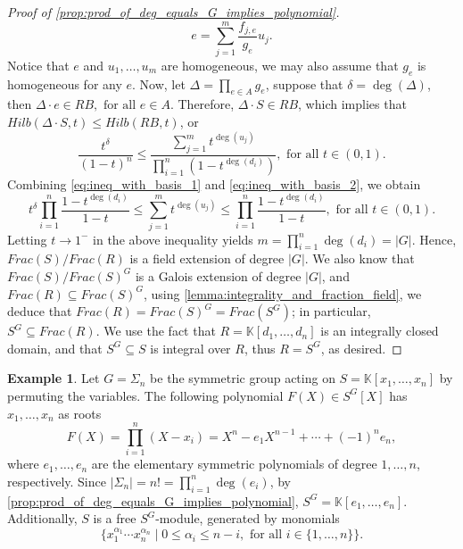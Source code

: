 \documentclass[12pt,a4paper]{report}
\theoremstyle{definition}
\theoremstyle{remark}
\theoremstyle{definition}
\newtheorem{example}[theorem]{Example}
\begin{document}
\begin{proof}[Proof of \cref{prop:prod_of_deg_equals_G_implies_polynomial}]
    \begin{equation*}
        e = \sum\limits_{j=1}^{m}\dfrac{f_{j, e}}{g_{e}}u_j.
    \end{equation*}
    Notice that $e$ and $u_1, \ldots, u_m$ are homogeneous, we may also assume that $g_e$ is homogeneous for any $e$. Now, let $\Delta =\prod\limits_{e\in A}g_e$, suppose that $\delta = \deg(\Delta)$, then $\Delta\cdot e\in RB, \text{ for all } e\in A$. Therefore, $\Delta\cdot S\in RB$, which implies that $Hilb(\Delta\cdot S, t)\leq Hilb(RB, t)$, or
    \begin{equation}\label{eq:ineq_with_basis_2}
        \dfrac{t^{\delta}}{(1-t)^n}\leq \dfrac{\sum\limits_{j=1}^{m}t^{\deg(u_j)}}{\prod\limits_{i=1}^{n}\left(1-t^{\deg(d_i)}\right)}, \text{ for all } t\in (0, 1).
    \end{equation}
    Combining \eqref{eq:ineq_with_basis_1} and \eqref{eq:ineq_with_basis_2}, we obtain
    \begin{equation*}
        t^{\delta}\prod\limits_{i=1}^{n}\dfrac{1-t^{\deg(d_i)}}{1-t}\leq \sum\limits_{j=1}^{m}t^{\deg(u_j)}\leq \prod\limits_{i=1}^{n}\dfrac{1-t^{\deg(d_i)}}{1-t}, \text{ for all } t\in (0, 1).
    \end{equation*}
    Letting $t\to 1^{-}$ in the above inequality yields $m = \prod\limits_{i=1}^{n}\deg(d_i) = |G|$. Hence, $Frac(S)/Frac(R)$ is a field extension of degree $|G|$. We also know that $Frac(S)/Frac(S)^G$ is a Galois extension of degree $|G|$, and $Frac(R) \subseteq Frac(S)^G$, using \cref{lemma:integrality_and_fraction_field}, we deduce that $Frac(R) = Frac(S)^G = Frac(S^G)$; in particular, $S^G\subseteq Frac(R)$. We use the fact that $R = \mathbb{K}[d_1, \ldots, d_n]$ is an integrally closed domain, and that $S^G \subseteq S$ is integral over $R$, thus $R = S^G$, as desired.
\end{proof}
\begin{example}\label{example:symmetric_polynomial}
    Let $G=\Sigma_n$ be the symmetric group acting on $S = \mathbb{K}[x_1, \ldots, x_n]$ by permuting the variables. The following polynomial $F(X)\in S^G[X]$ has $x_1, \ldots, x_n$ as roots
    \begin{equation*}
        F(X) = \prod\limits_{i=1}^{n}(X-x_i) = X^n - e_1 X^{n-1} + \cdots  + (-1)^n e_n,
    \end{equation*}
    where $e_1, \ldots, e_n$ are the elementary symmetric polynomials of degree $1, \ldots, n$, respectively. Since $|\Sigma_n| = n! = \prod\limits_{i=1}^n \deg(e_i)$, by \cref{prop:prod_of_deg_equals_G_implies_polynomial}, $S^G = \mathbb{K}[e_1, \ldots, e_n]$. Additionally, $S$ is a free $S^G$-module, generated by monomials
    \begin{equation*}
        \{x_1^{\alpha_1}\cdots x_n^{\alpha_n}\mid 0\leq\alpha_i \leq n-i, \text{ for all } i\in \{1, \ldots, n\}\}.
    \end{equation*}
\end{example}
\end{document}
